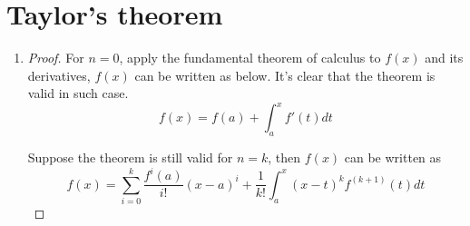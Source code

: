 \documentclass[paper=a4, fontsize=11pt]{scrartcl} %
\numberwithin{equation}{section} %
\numberwithin{figure}{section} %
\numberwithin{table}{section} %
\begin{document}
\section{Taylor's theorem}
	\begin{enumerate}
		\item 
			\begin{proof}
				For $n=0$, apply the fundamental theorem of calculus to $f(x)$ and its derivatives, $f(x)$ can be written as below. It's clear that the theorem is valid in such case.
				\begin{equation}
					f(x) = f(a) + \int_{a}^{x} f'(t) dt
				\end{equation}
				
				Suppose the theorem is still valid for $n = k$, then $f(x)$ can be written as 
				\begin{equation}
					f(x) = \sum_{i=0}^{k}\frac{f^{i}(a)}{i!}(x-a)^i + \frac{1}{k!}\int_{a}^{x} (x-t)^k f^{(k+1)}(t) dt \label{rhs}
				\end{equation}
				

\end{proof}
\end{enumerate}
\end{document}
